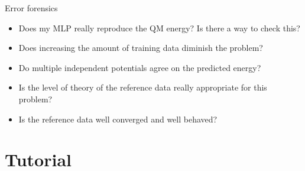 \documentclass[9pt,bestpractices]{livecoms}
\begin{document}
\begin{Checklists*}[p!]
\begin{checklist}{Error forensics}
\begin{itemize}
\item Does my MLP really reproduce the QM energy? Is there a way to check this?
\item Does increasing the amount of training data diminish the problem?
\item Do multiple independent potentials agree on the predicted energy?
\item Is the level of theory of the reference data really appropriate for this problem?
\item Is the reference data well converged and well behaved?
\end{itemize}
\end{checklist}

\end{Checklists*}











\section{Tutorial}
\end{document}
